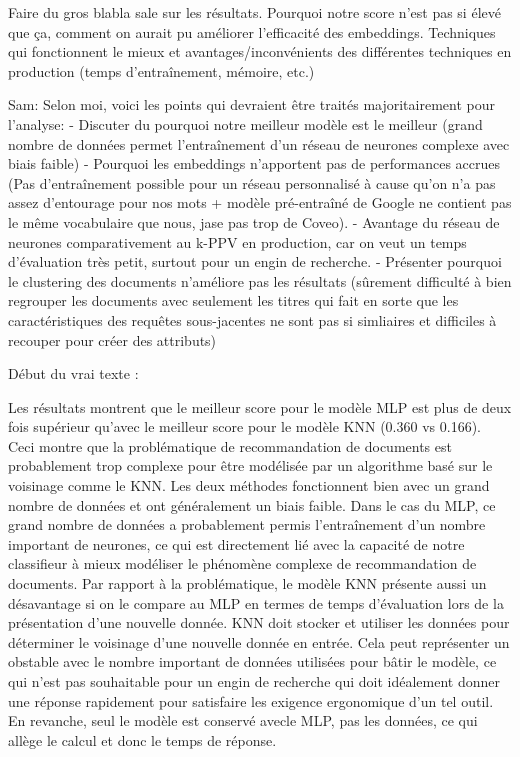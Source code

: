 Faire du gros blabla sale sur les résultats. Pourquoi notre score n'est pas si élevé que ça, comment on aurait pu améliorer l'efficacité des embeddings. Techniques qui fonctionnent le mieux et avantages/inconvénients des différentes techniques en production (temps d'entraînement, mémoire, etc.)

Sam: Selon moi, voici les points qui devraient être traités majoritairement pour l'analyse:
	- Discuter du pourquoi notre meilleur modèle est le meilleur (grand nombre de données permet l'entraînement d'un réseau de neurones complexe avec biais faible)
	- Pourquoi les embeddings n'apportent pas de performances accrues (Pas d'entraînement possible pour un réseau personnalisé à cause qu'on n'a pas assez d'entourage pour nos mots + modèle pré-entraîné de Google ne contient pas le même vocabulaire que nous, jase pas trop de Coveo).
	- Avantage du réseau de neurones comparativement au k-PPV en production, car on veut un temps d'évaluation très petit, surtout pour un engin de recherche.
	- Présenter pourquoi le clustering des documents n'améliore pas les résultats (sûrement difficulté à bien regrouper les documents avec seulement les titres qui fait en sorte que les caractéristiques des requêtes sous-jacentes ne sont pas si simliaires et difficiles à recouper pour créer des attributs)
\break

Début du vrai texte :
\break

Les résultats montrent que le meilleur score pour le modèle MLP est plus de deux fois supérieur qu'avec le meilleur score pour le modèle KNN (0.360 vs 0.166). Ceci montre que la problématique de recommandation de documents est probablement trop complexe pour être modélisée par un algorithme basé sur le voisinage comme le KNN. Les deux méthodes fonctionnent  bien avec un grand nombre de données et ont généralement un biais faible. Dans le cas du MLP, ce grand nombre de données a probablement permis l'entraînement d'un nombre important de neurones, ce qui est directement lié avec la capacité de notre classifieur à mieux modéliser le phénomène complexe de recommandation de documents. Par rapport à la problématique, le modèle KNN présente aussi un désavantage si on le compare au MLP en termes de temps d'évaluation lors de la présentation d'une nouvelle donnée. KNN doit stocker et utiliser les données pour déterminer le voisinage d'une nouvelle donnée en entrée. Cela peut représenter un obstable avec le nombre important de données utilisées pour bâtir le modèle, ce qui n'est pas souhaitable pour un engin de recherche qui doit idéalement donner une réponse rapidement pour satisfaire les exigence ergonomique d'un tel outil. En revanche, seul le modèle est conservé avecle MLP, pas les données, ce qui allège le calcul et donc le temps de réponse.
\break

	